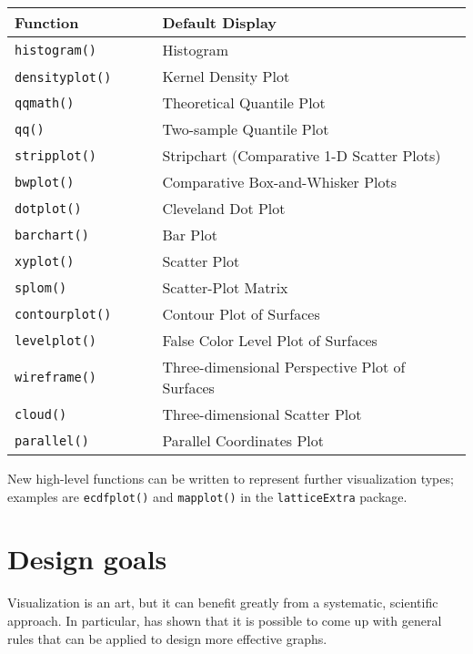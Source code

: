 \documentclass[10pt]{article}
\newcommand{\code}[1]{\texttt{#1}}
\newcommand{\Rpackage}[1]{\code{#1}}
\newcommand{\Rfunction}[1]{\code{#1()}}
\begin{document}
\begin{center}
  \begin{tabular}{ll}
    \hline
    \textbf{Function} & \textbf{Default Display} \\
    \hline
    \Rfunction{histogram} & Histogram \\
    \Rfunction{densityplot}~~~~~ & Kernel Density Plot \\
    \Rfunction{qqmath} & Theoretical Quantile Plot  \\
    \Rfunction{qq} & Two-sample Quantile Plot \\
    \Rfunction{stripplot} & Stripchart (Comparative 1-D Scatter Plots) \\
    \Rfunction{bwplot} & Comparative Box-and-Whisker Plots \\
    \Rfunction{dotplot} & Cleveland Dot Plot \\
    \Rfunction{barchart} & Bar Plot \\
    \Rfunction{xyplot} & Scatter Plot \\
    \Rfunction{splom} & Scatter-Plot Matrix \\
    \Rfunction{contourplot} & Contour Plot of Surfaces \\
    \Rfunction{levelplot} & False Color Level Plot of Surfaces \\
    \Rfunction{wireframe} & Three-dimensional Perspective Plot of Surfaces  \\
    \Rfunction{cloud} & Three-dimensional Scatter Plot \\
    \Rfunction{parallel} & Parallel Coordinates Plot \\
    \hline
  \end{tabular}
\end{center}
New high-level functions can be written to represent further
visualization types; examples are \Rfunction{ecdfplot} and
\Rfunction{mapplot} in the \Rpackage{latticeExtra} package.


\newpage

\section*{Design goals}


Visualization is an art, but it can benefit greatly from a systematic,
scientific approach.  In particular, \citet{Clev:EOGD} has shown that
it is possible to come up with general rules that can be applied to
design more effective graphs.
\end{document}
